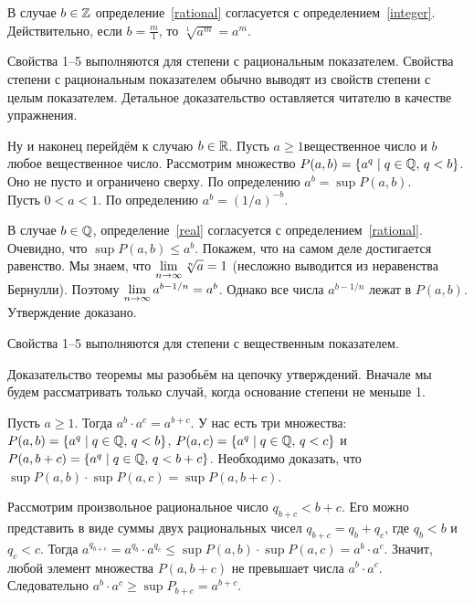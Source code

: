 \documentclass[a4paper,12pt,fleqn]{article}
\begin{document}
В случае $b\in\mathbb{Z}$ определение~\ref{rational} согласуется с определением~\ref{integer}.
Действительно, если $b = \frac{m}{1}$, то $\sqrt[1]{a^m} = a^m$.

\label{rational_properties}
Свойства 1--5 выполняются для степени с рациональным показателем.
Свойства степени с рациональным показателем обычно выводят из свойств степени с целым показателем. Детальное доказательство оставляется читателю в качестве упражнения.

Ну и наконец перейдём к случаю $b\in\mathbb{R}$.
\label{real}
Пусть $a \ge 1$\т вещественное число и $b$\т любое вещественное число. Рассмотрим множество $P(a,b) = \{a^q \mid q\in\mathbb{Q},\, q < b\}$. Оно не пусто и ограничено сверху. По определению $a^b = \sup P(a,b)$.\\
Пусть $0 < a < 1$. По определению $a^b = (1/a)^{-b}$.

В случае $b \in \mathbb{Q}$, определение~\ref{real} согласуется с определением~\ref{rational}.
Очевидно, что $\sup P(a,b) \le a^b$. Покажем, что на самом деле достигается равенство. Мы знаем, что $\lim\limits_{n \rightarrow \infty} \sqrt[n]{a} = 1$ (несложно выводится из неравенства Бернулли). Поэтому $\lim\limits_{n \rightarrow \infty} a^{b - 1/n} = a^b$. Однако все числа $a^{b - 1/n}$ лежат в $P(a,b)$. Утверждение доказано.

\label{real_properties}
Свойства 1--5 выполняются для степени с вещественным показателем.

Доказательство теоремы мы разобьём на цепочку утверждений. Вначале мы будем рассматривать только случай, когда основание степени не меньше 1.


\label{real_additivity}
Пусть $a \ge 1$. Тогда $a^b \cdot a^c = a^{b+c}$.
У нас есть три множества: $P(a,b) = \{a^q \mid q\in\mathbb{Q},\, q < b\}$, $P(a,c) = \{a^q \mid q\in\mathbb{Q},\, q < c\}$ и $P(a,b+c) = \{a^q \mid q\in\mathbb{Q},\, q < b+c\}$. Необходимо доказать, что $\sup P(a,b) \cdot \sup P(a,c) = \sup P(a,b+c)$.

Рассмотрим произвольное рациональное число $q_{b+c} < b+c$. Его можно представить в виде суммы двух рациональных чисел $q_{b+c} = q_b + q_c$, где $q_b < b$ и $q_c < c$. Тогда $a^{q_{b+c}} = a^{q_b}\cdot a^{q_c} \le \sup P(a,b) \cdot \sup P(a,c) = a^b \cdot a^c$. Значит, любой элемент множества $P(a,b+c)$ не превышает числа $a^b \cdot a^c$. Следовательно $a^b \cdot a^c \ge \sup P_{b+c} = a^{b+c}$.
\end{document}
